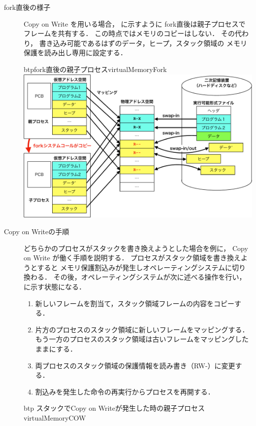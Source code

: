 \begin{description}
\item[fork直後の様子]
  Copy on Write を用いる場合，
  に示すように
  fork直後は親子プロセスでフレームを共有する．
  この時点ではメモリのコピーはしない．
  その代わり，
  書き込み可能であるはずのデータ，ヒープ，スタック領域の
  メモリ保護を読み出し専用に設定する．
  \begin{myfig}{btp}{fork直後の親子プロセス}{virtualMemoryFork}
    \includegraphics[scale=0.66]{Fig/virtualMemoryFork-crop.pdf}
  \end{myfig}
\item[Copy on Writeの手順]
  どちらかのプロセスがスタックを書き換えようとした場合を例に，
  Copy on Write が働く手順を説明する．
  プロセスがスタック領域を書き換えようとすると
  メモリ保護割込みが発生しオペレーティングシステムに切り換わる．
  その後，オペレーティングシステムが次に述べる操作を行い，
  に示す状態になる．
  \begin{enumerate}
  \item 新しいフレームを割当て，スタック領域フレームの内容をコピーする．
  \item 片方のプロセスのスタック領域に新しいフレームをマッピングする．
    もう一方のプロセスのスタック領域は古いフレームをマッピングしたままにする．
  \item 両プロセスのスタック領域の保護情報を読み書き（RW-）に変更する．
  \item 割込みを発生した命令の再実行からプロセスを再開する．
  \end{enumerate}
  \begin{myfig}{btp}
    {スタックでCopy on Writeが発生した時の親子プロセス}{virtualMemoryCOW}

\end{myfig}
\end{description}
